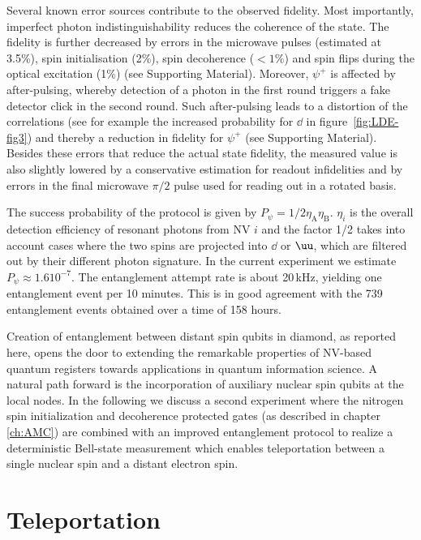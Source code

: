 Several known error sources contribute to the observed fidelity. Most importantly, imperfect photon indistinguishability reduces the coherence of the state. The fidelity is further decreased by errors in the microwave pulses (estimated at 3.5\%), spin initialisation (2\%), spin decoherence ($<1$\%) and spin flips during the optical excitation (1\%) (see Supporting Material). Moreover, $\psi^+$ is affected by after-pulsing, whereby detection of a photon in the first round triggers a fake detector click in the second round. Such after-pulsing leads to a distortion of the correlations (see for example the increased probability for $\dd$ in figure~\ref{fig:LDE-fig3}) and thereby a reduction in fidelity for $\psi^+$ (see Supporting Material). Besides these errors that reduce the actual state fidelity, the measured value is also slightly lowered by a conservative estimation for readout infidelities and by errors in the final microwave $\pi/2$ pulse used for reading out in a rotated basis.

The success probability of the protocol is given by $P_\psi =1/2 \eta_\text{A}\eta_\text{B}$. $\eta_i$ is the overall detection efficiency of resonant photons from NV $i$ and the factor 1/2 takes into account cases where the two spins are projected into $\dd$ or $\uu$, which are filtered out by their different photon signature. In the current experiment we estimate $P_\psi \approx 1.6 10^{-7}$. The entanglement attempt rate is about 20$\,$kHz, yielding one entanglement event per 10 minutes. This is in good agreement with the 739 entanglement events obtained over a time of 158 hours.

Creation of entanglement between distant spin qubits in diamond, as reported here, opens the door to extending the remarkable properties of NV-based quantum registers towards applications in quantum information science. A natural path forward is the incorporation of auxiliary nuclear spin qubits at the local nodes. In the following we discuss a second experiment where the nitrogen spin initialization and decoherence protected gates (as described in chapter \ref{ch:AMC}) are combined with an improved entanglement protocol to realize a deterministic Bell-state measurement which enables teleportation between a single nuclear spin and a distant electron spin.

\section{Teleportation}

